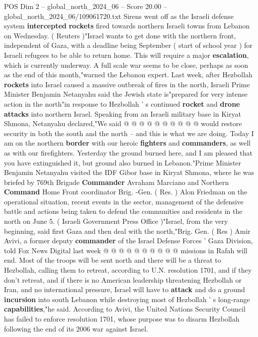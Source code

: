 \begin{textsample}{POS Dim 2 – global\_north\_2024\_06 – Score 20.00 – global\_north\_2024\_06/109061720.txt}
Sirens went off as the Israeli defense system \textbf{intercepted} \textbf{rockets} fired towards northern Israeli towns from Lebanon on Wednesday. ( Reuters )"Israel wants to get done with the northern front, independent of Gaza, with a deadline being September ( start of school year ) for Israeli refugees to be able to return home.
This will require a major \textbf{escalation}, which is currently underway.
A full scale war seems to be close, perhaps as soon as the end of this month,"warned the Lebanon expert.
Last week, after Hezbollah \textbf{rockets} into Israel caused a massive outbreak of fires in the north, Israeli Prime Minister Benjamin Netanyahu said the Jewish state is"prepared for very intense action in the north"in response to Hezbollah ' s continued \textbf{rocket} and \textbf{drone} \textbf{attacks} into northern Israel.
Speaking from an Israeli military base in Kiryat Shmona, Netanyahu declared,"We said @ @ @ @ @ @ @ @ @ @ would restore security in both the south and the north -- and this is what we are doing.
Today I am on the northern \textbf{border} with our heroic \textbf{fighters} and \textbf{commanders}, as well as with our firefighters.
Yesterday the ground burned here, and I am pleased that you have extinguished it, but ground also burned in Lebanon."Prime Minister Benjamin Netanyahu visited the IDF Gibor base in Kiryat Shmona, where he was briefed by 769th Brigade \textbf{Commander} Avraham Marciano and Northern \textbf{Command} Home Front coordinator Brig. -Gen. ( Res. ) Alon Friedman on the operational situation, recent events in the sector, management of the defensive battle and actions being taken to defend the communities and residents in the north on June 5. ( Israeli Government Press Office )"Israel, from the very beginning, said first Gaza and then deal with the north,"Brig.
Gen. ( Res ) Amir Avivi, a former deputy \textbf{commander} of the Israel Defense Forces ' Gaza Division, told Fox News Digital last week @ @ @ @ @ @ @ @ @ @ missions in Rafah will end.
Most of the troops will be sent north and there will be a threat to Hezbollah, calling them to retreat, according to U.N. resolution 1701, and if they don't retreat, and if there is no American leadership threatening Hezbollah or Iran, and no international pressure, Israel will have to \textbf{attack} and do a ground \textbf{incursion} into south Lebanon while destroying most of Hezbollah ' s long-range \textbf{capabilities},"he said.
According to Avivi, the United Nations Security Council has failed to enforce resolution 1701, whose purpose was to disarm Hezbollah following the end of its 2006 war against Israel.

\end{textsample}
